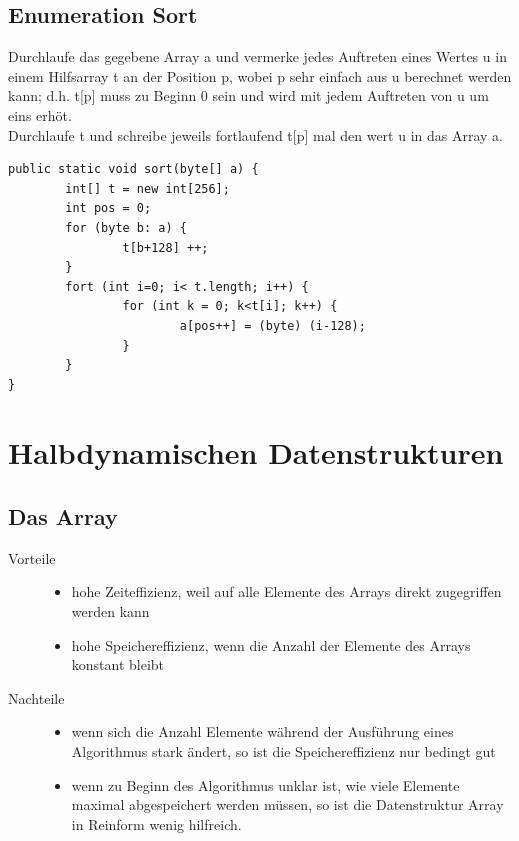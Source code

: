 \documentclass[a4paper,10pt]{article}
\begin{document}
\subsection{Enumeration Sort}
Durchlaufe das gegebene Array a und vermerke jedes Auftreten eines Wertes u in einem Hilfsarray t an der Position p, wobei p sehr einfach aus u berechnet werden kann; d.h. t[p] muss zu Beginn 0 sein und wird mit jedem Auftreten von u um eins erh\"ot. \\
Durchlaufe t und schreibe jeweils fortlaufend t[p] mal den wert u  in das Array a.
\begin{lstlisting}
public static void sort(byte[] a) {
		int[] t = new int[256];
		int pos = 0;
		for (byte b: a) {
				t[b+128] ++;
		}
		fort (int i=0; i< t.length; i++) {
				for (int k = 0; k<t[i]; k++) {
						a[pos++] = (byte) (i-128);
				}
		}
}
\end{lstlisting}

\newpage
\section{Halbdynamischen Datenstrukturen}

\subsection{Das Array}

\begin{description}
	\item[Vorteile]  \hfill
		\begin{itemize}
			\item hohe Zeiteffizienz, weil auf alle Elemente des Arrays direkt zugegriffen werden kann
			\item hohe Speichereffizienz, wenn die Anzahl der Elemente des Arrays konstant bleibt
		\end{itemize}
	\item[Nachteile] \hfill
		\begin{itemize}
			\item wenn sich die Anzahl Elemente w\"ahrend der Ausf\"uhrung eines Algorithmus stark \"andert, so ist die Speichereffizienz nur bedingt gut
			\item wenn zu Beginn des Algorithmus unklar ist, wie viele Elemente maximal abgespeichert werden m\"ussen, so ist die Datenstruktur Array in Reinform wenig hilfreich.
		\end{itemize}
\end{description}
\end{document}
